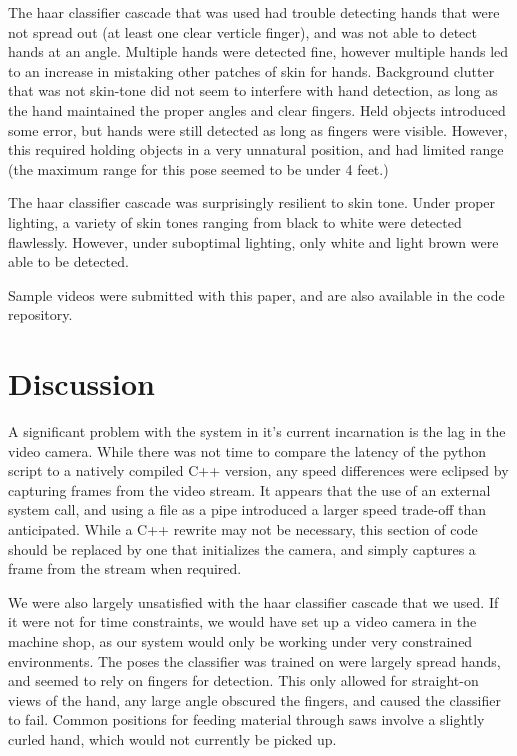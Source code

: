 \documentclass[12pt]{article}
\begin{document}
The haar classifier cascade that was used had trouble detecting hands that were not spread out (at least one clear verticle finger), and was not able to detect hands at an angle. Multiple hands were detected fine, however multiple hands led to an increase in mistaking other patches of skin for hands. Background clutter that was not skin-tone did not seem to interfere with hand detection, as long as the hand maintained the proper angles and clear fingers. Held objects introduced some error, but hands were still detected as long as fingers were visible. However, this required holding objects in a very unnatural position, and had limited range (the maximum range for this pose seemed to be under 4 feet.)

The haar classifier cascade was surprisingly resilient to skin tone. Under proper lighting, a variety of skin tones ranging from black to white were detected flawlessly. However, under suboptimal lighting, only white and light brown were able to be detected.

Sample videos were submitted with this paper, and are also available in the code repository\cite{google-code}.

\section{Discussion}
A significant problem with the system in it's current incarnation is the lag in the video camera. While there was not time to compare the latency of the python script to a natively compiled C++ version, any speed differences were eclipsed by capturing frames from the video stream. It appears that the use of an external system call, and using a file as a pipe introduced a larger speed trade-off than anticipated. While a C++ rewrite may not be necessary, this section of code should be replaced by one that initializes the camera, and simply captures a frame from the stream when required.

We were also largely unsatisfied with the haar classifier cascade that we used. If it were not for time constraints, we would have set up a video camera in the machine shop, as our system would only be working under very constrained environments. The poses the classifier was trained on were largely spread hands, and seemed to rely on fingers for detection. This only allowed for straight-on views of the hand, any large angle obscured the fingers, and caused the classifier to fail. Common positions for feeding material through saws involve a slightly curled hand, which would not currently be picked up.
\end{document}
